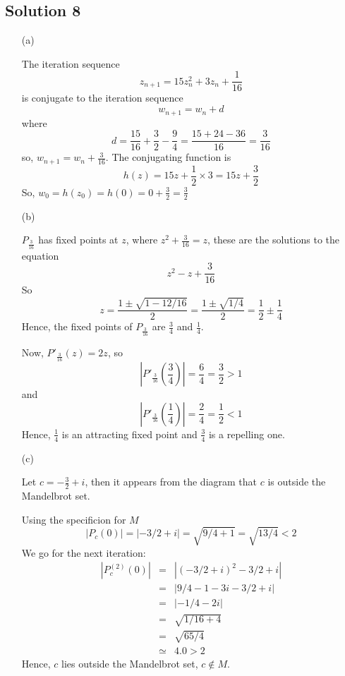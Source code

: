 \subsection*{Solution 8}

\begin{itemize}
\item[(a)]

The iteration sequence
\[
z_{n+1} = 15z_n^2 + 3z_n + \frac{1}{16}
\]
is conjugate to the iteration sequence
\[
w_{n+1} = w_n+d
\]
where
\[
d = \frac{15}{16} + \frac{3}{2} - \frac{9}{4} = \frac{15+24-36}{16} = \frac{3}{16}
\]
so, $w_{n+1} = w_n+\frac{3}{16}$.
The conjugating function is
\[
h(z) = 15z+\frac{1}{2}\times3 = 15z+\frac{3}{2}
\]
So, $w_0 = h(z_0) = h(0) = 0+\frac{3}{2} = \frac{3}{2}$

\item[(b)]

$P_{\frac{3}{16}}$ has fixed points at $z$, where $z^2+\frac{3}{16}=z$, these are the solutions to the equation
\[
z^2-z+\frac{3}{16}
\]
So
\[
z = \frac{ 1 \pm \sqrt{1 - 12/16} }{ 2 } = \frac{ 1 \pm \sqrt{1/4} }{ 2 } = \frac{1}{2}\pm\frac{1}{4}
\]
Hence, the fixed points of $P_{\frac{3}{16}}$ are $\frac{3}{4}$ and $\frac{1}{4}$.

Now, $P'_{\frac{3}{16}}(z) = 2z$, so
\[ \left|P'_{\frac{3}{16}}\left(\frac{3}{4}\right)\right| = \frac{6}{4} = \frac{3}{2} > 1 \]
and
\[ \left|P'_{\frac{3}{16}}\left(\frac{1}{4}\right)\right| = \frac{2}{4} = \frac{1}{2} < 1 \]
Hence, $\frac{1}{4}$ is an attracting fixed point and $\frac{3}{4}$ is a repelling one.

\item[(c)]

Let $c=-\frac{3}{2}+i$, then it appears from the diagram that $c$ is
outside the Mandelbrot set.

Using the specificion for $M$
\[
|P_c(0)| = |-3/2+i| = \sqrt{9/4+1} = \sqrt{13/4} < 2
\]
We go for the next iteration:
\begin{eqnarray*}
|P_c^{(2)}(0)|
	&=& |(-3/2+i)^2-3/2+i| \\
	&=& |9/4-1-3i-3/2+i| \\
	&=& |-1/4-2i| \\
	&=& \sqrt{1/16+4} \\
	&=& \sqrt{65/4} \\
	&\simeq& 4.0 > 2
\end{eqnarray*}
Hence, $c$ lies outside the Mandelbrot set, $c\not\in M$.

\end{itemize}

